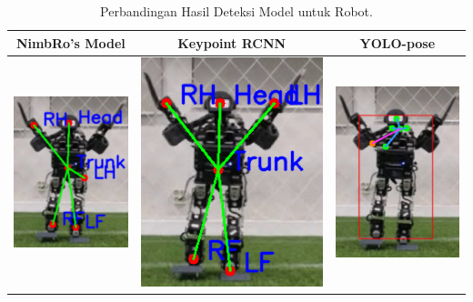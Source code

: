\newpage
\def\arraystretch{0.5}
\begin{longtable}{|c|c|c|}
  \caption{Perbandingan Hasil Deteksi Model untuk Robot.}
  \label{tb:robotmodelcomparisondetectionresults}\\
  \hline
  \rowcolor[HTML]{C0C0C0}
  \textbf{NimbRo's Model}    & \textbf{Keypoint RCNN} & \textbf{YOLO-pose}\\
  \hline
  \includegraphics[scale=0.85]{gambar/nimbro-1.png} & \includegraphics[scale=0.48]{gambar/rcnn-1.png} & \includegraphics[scale=0.66]{gambar/yolo-1.png} \\

\end{longtable}
